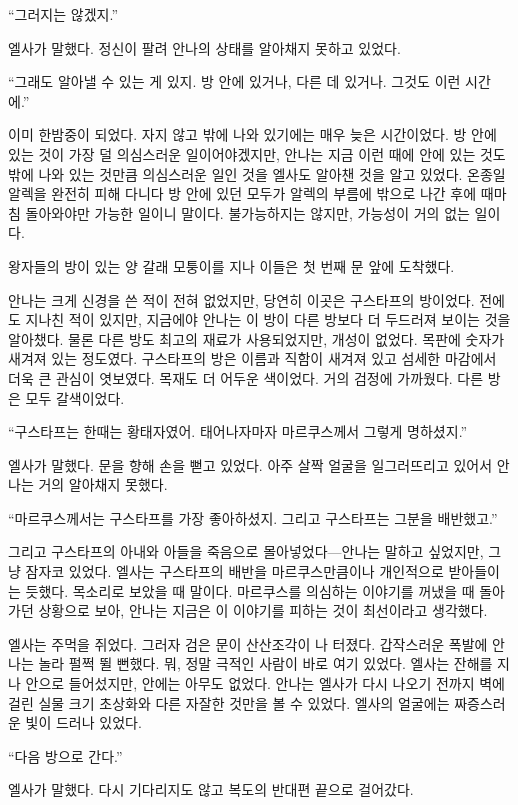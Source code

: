 ``그러지는 않겠지.''

엘사가 말했다. 정신이 팔려 안나의 상태를 알아채지 못하고 있었다.

``그래도 알아낼 수 있는 게 있지. 방 안에 있거나, 다른 데 있거나. 그것도 이런 시간에.''

이미 한밤중이 되었다. 자지 않고 밖에 나와 있기에는 매우 늦은 시간이었다. 방 안에 있는 것이 가장 덜 의심스러운 일이어야겠지만, 안나는 지금 이런 때에 안에 있는 것도 밖에 나와 있는 것만큼 의심스러운 일인 것을 엘사도 알아챈 것을 알고 있었다. 온종일 알렉을 완전히 피해 다니다 방 안에 있던 모두가 알렉의 부름에 밖으로 나간 후에 때마침 돌아와야만 가능한 일이니 말이다. 불가능하지는 않지만, 가능성이 거의 없는 일이다.

왕자들의 방이 있는 양 갈래 모퉁이를 지나 이들은 첫 번째 문 앞에 도착했다.

안나는 크게 신경을 쓴 적이 전혀 없었지만, 당연히 이곳은 구스타프의 방이었다. 전에도 지나친 적이 있지만, 지금에야 안나는 이 방이 다른 방보다 더 두드러져 보이는 것을 알아챘다. 물론 다른 방도 최고의 재료가 사용되었지만, 개성이 없었다. 목판에 숫자가 새겨져 있는 정도였다. 구스타프의 방은 이름과 직함이 새겨져 있고 섬세한 마감에서 더욱 큰 관심이 엿보였다. 목재도 더 어두운 색이었다. 거의 검정에 가까웠다. 다른 방은 모두 갈색이었다.

``구스타프는 한때는 황태자였어. 태어나자마자 마르쿠스께서 그렇게 명하셨지.''

엘사가 말했다. 문을 향해 손을 뻗고 있었다. 아주 살짝 얼굴을 일그러뜨리고 있어서 안나는 거의 알아채지 못했다.

``마르쿠스께서는 구스타프를 가장 좋아하셨지. 그리고 구스타프는 그분을 배반했고.''

그리고 구스타프의 아내와 아들을 죽음으로 몰아넣었다—안나는 말하고 싶었지만, 그냥 잠자코 있었다. 엘사는 구스타프의 배반을 마르쿠스만큼이나 개인적으로 받아들이는 듯했다. 목소리로 보았을 때 말이다. 마르쿠스를 의심하는 이야기를 꺼냈을 때 돌아가던 상황으로 보아, 안나는 지금은 이 이야기를 피하는 것이 최선이라고 생각했다.

엘사는 주먹을 쥐었다. 그러자 검은 문이 산산조각이 나 터졌다. 갑작스러운 폭발에 안나는 놀라 펄쩍 뛸 뻔했다. 뭐, 정말 극적인 사람이 바로 여기 있었다. 엘사는 잔해를 지나 안으로 들어섰지만, 안에는 아무도 없었다. 안나는 엘사가 다시 나오기 전까지 벽에 걸린 실물 크기 초상화와 다른 자잘한 것만을 볼 수 있었다. 엘사의 얼굴에는 짜증스러운 빛이 드러나 있었다.

``다음 방으로 간다.''

엘사가 말했다. 다시 기다리지도 않고 복도의 반대편 끝으로 걸어갔다.

